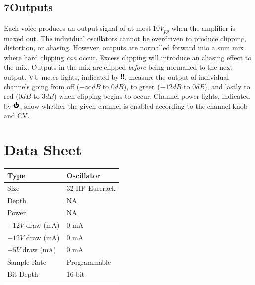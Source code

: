 \documentclass[12pt,letter]{article}
\begin{document}
\subsection*{7{\quad}Outputs}

Each voice produces an output signal of at most $10V_{pp}$ when the amplifier is maxed out. The individual oscillators cannot be overdriven to produce clipping, distortion, or aliasing. However, outputs are normalled forward into a sum mix where hard clipping \textit{can} occur. Excess clipping will introduce an aliasing effect to the mix. Outputs in the mix are clipped \textit{before} being normalled to the next output. VU meter lights, indicated by \includegraphics[height=\baselineskip]{VU}, measure the output of individual channels going from off ($-\infty dB$ to $0dB$), to green ($-12dB$ to $0dB$), and lastly to red ($0dB$ to $3dB$) when clipping begins to occur. Channel power lights, indicated by \includegraphics[height=\baselineskip]{OnOff}, show whether the given channel is enabled according to the channel knob and CV.


\clearpage
\section*{Data Sheet}

\begin{table}[!htp]
\begin{tabular}{|l|l|}
\hline
Type             & Oscillator               \\
\hline
Size             & 32 HP Eurorack           \\
\hline
Depth            & NA                       \\
\hline
Power            & NA                       \\ %
\hline
$+12V$ draw (mA) & 0 mA                     \\
\hline
$-12V$ draw (mA) & 0 mA                     \\
\hline
$+5V$ draw (mA)  & 0 mA                     \\
\hline
Sample Rate      & Programmable             \\
\hline
Bit Depth        & 16-bit                   \\
\hline
\end{tabular}
\end{table}


\clearpage
\renewcommand\refname{References \& Acknowledgments}
\nocite{*}


\end{document}
